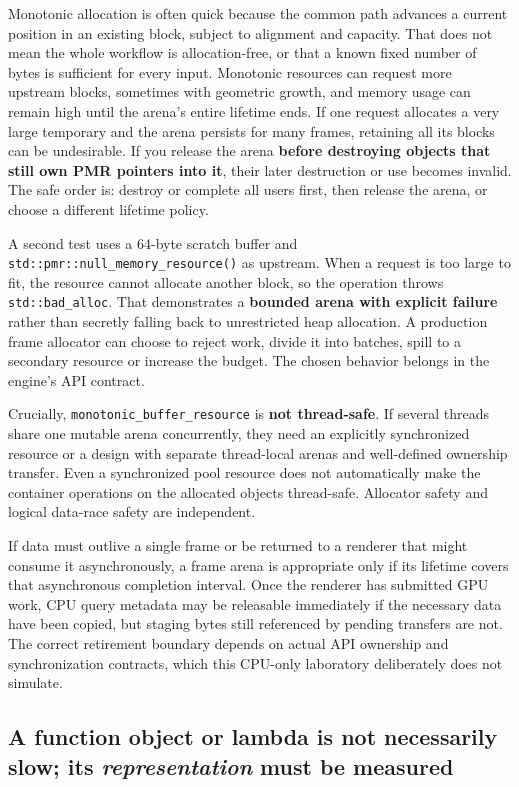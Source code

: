 Monotonic allocation is often quick because the common path advances a current position in an existing block, subject to alignment and capacity. That does not mean the whole workflow is allocation-free, or that a known fixed number of bytes is sufficient for every input. Monotonic resources can request more upstream blocks, sometimes with geometric growth, and memory usage can remain high until the arena's entire lifetime ends. If one request allocates a very large temporary and the arena persists for many frames, retaining all its blocks can be undesirable. If you release the arena \textbf{before destroying objects that still own PMR pointers into it}, their later destruction or use becomes invalid. The safe order is: destroy or complete all users first, then release the arena, or choose a different lifetime policy.

A second test uses a 64-byte scratch buffer and \texttt{std::pmr::null\_memory\_resource()} as upstream. When a request is too large to fit, the resource cannot allocate another block, so the operation throws \texttt{std::bad\_alloc}. That demonstrates a \textbf{bounded arena with explicit failure} rather than secretly falling back to unrestricted heap allocation. A production frame allocator can choose to reject work, divide it into batches, spill to a secondary resource or increase the budget. The chosen behavior belongs in the engine's API contract.

Crucially, \texttt{monotonic\_buffer\_resource} is \textbf{not thread-safe}. If several threads share one mutable arena concurrently, they need an explicitly synchronized resource or a design with separate thread-local arenas and well-defined ownership transfer. Even a synchronized pool resource does not automatically make the container operations on the allocated objects thread-safe. Allocator safety and logical data-race safety are independent.

If data must outlive a single frame or be returned to a renderer that might consume it asynchronously, a frame arena is appropriate only if its lifetime covers that asynchronous completion interval. Once the renderer has submitted GPU work, CPU query metadata may be releasable immediately if the necessary data have been copied, but staging bytes still referenced by pending transfers are not. The correct retirement boundary depends on actual API ownership and synchronization contracts, which this CPU-only laboratory deliberately does not simulate.

\subsection{\texorpdfstring{A function object or lambda is not necessarily slow; its \emph{representation} must be measured}{A function object or lambda is not necessarily slow; its representation must be measured}}\label{05-engine-i-ch006-a-function-object-or-lambda-is-not-necessarily-slow-its-representation-must-be-measured}

